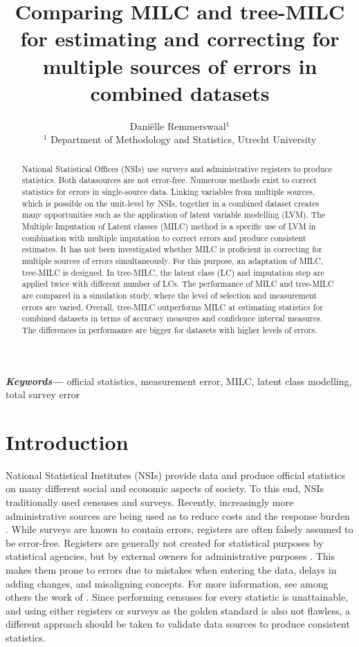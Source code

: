 \documentclass[a4paper, 11pt]{article} %
\title{Comparing MILC and tree-MILC for estimating and correcting for multiple sources of errors in combined datasets}
\author{Dani\"elle Remmerswaal$^1$ \\\footnotesize{$^1$ Department of Methodology and Statistics, Utrecht University}}
\providecommand{\keywords}[1]
{
  \small	
  \textbf{\textit{Keywords---}} #1
}
\begin{document}
  \maketitle
\begin{abstract} \noindent
National Statistical Offices (NSIs) use surveys and administrative registers to produce statistics. Both datasources are not error-free. Numerous methods exist to correct statistics for errors in single-source data. Linking variables from multiple sources, which is possible on the unit-level by NSIs, together in a combined dataset creates many opportunities such as the application of latent variable modelling (LVM). The Multiple Imputation of Latent classes (MILC) method is a specific use of LVM in combination with multiple imputation to correct errors and produce consistent estimates. It has not been investigated whether MILC is proficient in correcting for multiple sources of errors simultaneously. For this purpose, an adaptation of MILC, tree-MILC is designed. In tree-MILC, the latent class (LC) and imputation step are applied twice with different number of LCs. The performance of MILC and tree-MILC are compared in a simulation study, where the level of selection and measurement errors are varied. Overall, tree-MILC outperforms MILC at estimating statistics for combined datasets in terms of accuracy measures and confidence interval measures. The differences in performance are bigger for datasets with higher levels of errors.

\end{abstract}
\keywords{official statistics, measurement error, MILC, latent class modelling, total survey error}

\section{Introduction}
National Statistical Institutes (NSIs) provide data and produce official statistics on many different social and economic aspects of society. To this end, NSIs traditionally used censuses and surveys. Recently, increasingly more administrative sources are being used as to reduce costs and the response burden \cite{UNECE2011}. While surveys are known to contain errors, registers are often falsely assumed to be error-free. Registers are generally not created for statistical purposes by statistical agencies, but by external owners for administrative purposes . This makes them prone to errors due to mistakes when entering the data, delays in adding changes, and misaligning concepts. For more information, see among others the work of . Since performing censuses for every statistic is unattainable, and using either registers or surveys as the golden standard is also not flawless, a different approach should be taken to validate data sources to produce consistent statistics. 
\end{document}
